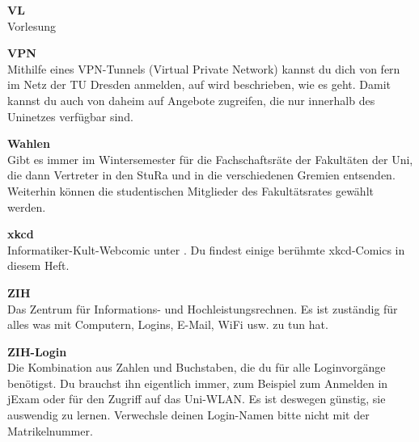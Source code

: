 \begin{multicols}{2}
\textbf{VL} \\
Vorlesung

\textbf{VPN}\\
Mithilfe eines VPN-Tunnels (Virtual Private Network) kannst du dich von fern im Netz der TU Dresden anmelden, auf  wird beschrieben, wie es geht.
Damit kannst du auch von daheim auf Angebote zugreifen, die nur innerhalb des Uninetzes verfügbar sind. 

\textbf{Wahlen} \\
Gibt es immer im Wintersemester für die Fachschaftsräte der Fakultäten der Uni, die dann Vertreter in den StuRa und in die verschiedenen Gremien entsenden.
Weiterhin können die studentischen Mitglieder des Fakultätsrates gewählt werden.

\textbf{xkcd} \\
Informatiker-Kult-Webcomic unter . Du findest einige berühmte xkcd-Comics in diesem Heft.

\textbf{ZIH} \\
Das Zentrum für Informations- und Hochleistungsrechnen.
Es ist zuständig für alles was mit Computern, Logins, E-Mail, WiFi usw. zu tun hat.

\textbf{ZIH-Login} \\
Die Kombination aus Zahlen und Buchstaben, die du für alle Loginvorgänge
benötigst. Du brauchst ihn eigentlich immer, zum Beispiel zum Anmelden in jExam
oder für den Zugriff auf das Uni-WLAN. Es ist deswegen günstig, sie auswendig
zu lernen. Verwechsle deinen Login-Namen bitte nicht mit der Matrikelnummer.

\end{multicols}

